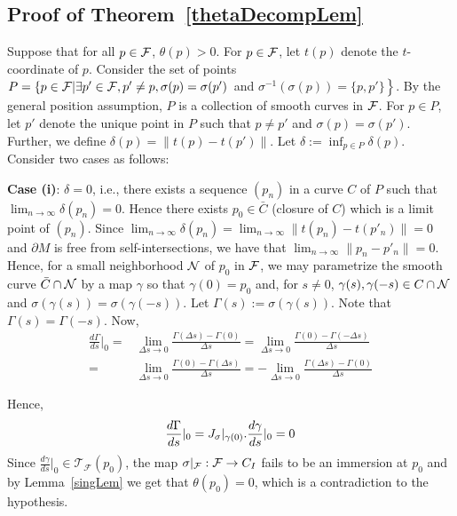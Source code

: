 \documentclass{elsart5p}
\begin{document}
\subsection{Proof of Theorem~\ref{thetaDecompLem}}  \label{proofSec}
  Suppose that for all $p \in {\cal F}$, $\theta(p) > 0$.  
For $p \in {\cal F}$, let $t(p)$ denote the $t$-coordinate of $p$.  
Consider the set of points 
$P = \left \{ p \in {\cal F} | \exists p' \in {\cal F}, p' \neq p, \sigma(p) = 
\sigma(p') \right.$ and $\left. \sigma^{-1}(\sigma(p)) =  \{ p, p' \} \right \}$.
By the general position assumption, $P$ is a collection of smooth curves in ${\cal F}$.
For $p \in P$, let $p'$ denote the unique point in $P$ such that $p \neq p'$ and 
$\sigma(p) = \sigma(p')$.
Further, we define $\delta(p) =  \| t(p) - t(p') \|$. 
Let $\delta := \displaystyle \inf_{p \in P} \delta(p)$.
Consider two cases as follows:

{\bf Case (i)}: $\delta = 0$, i.e., there exists a sequence $(p_n)$ in a curve $C$ of $P$ such that
$\displaystyle \lim_{n \to \infty} \delta(p_n) = 0$. Hence there exists $p_0 \in \bar{C}$ 
(closure of $C$)  which is a limit point of $(p_n)$.  Since $\displaystyle \lim_{n \to \infty} \delta(p_n) = 
\displaystyle \lim_{n \to \infty} \| t(p_n) - t(p'_n) \| = 0$ and $\partial M$ is free from self-intersections, 
we have that $\displaystyle \lim_{n \to \infty} \| p_n - p'_n \| = 0$. 
Hence, for a small neighborhood ${\cal N}$ of $p_0$ in ${\cal F}$,
we may parametrize the smooth curve 
$\bar{C} \cap {\cal N}$ by a map $\gamma$ so that $\gamma(0) = p_0$ and, for $s \neq 0$, 
$\gamma(s), \gamma(-s) \in C \cap {\cal N}$ and $\sigma(\gamma(s)) = \sigma(\gamma(-s))$.  
Let $\Gamma(s) := \sigma(\gamma(s))$.  Note that $\Gamma(s) = \Gamma(-s)$. Now, 
\begin{align*}
\frac{d \Gamma}{ds}| _{0} =& \displaystyle \lim_{\Delta s \to 0} \frac{\Gamma(\Delta s) - \Gamma(0)}{\Delta s} 
				= \lim_{\Delta s \to 0} \frac{\Gamma(0) - \Gamma(-\Delta s)}{\Delta s}\\
				=& \lim_{\Delta s \to 0} \frac{\Gamma(0) - \Gamma(\Delta s)}{\Delta s} 
				= \displaystyle -\lim_{\Delta s \to 0} \frac{\Gamma(\Delta s) - \Gamma(0)}{\Delta s} 
\end{align*}

Hence, 
\begin{align*}
\frac{d \Gamma}{ds}\arrowvert _{0} = J_{\sigma}|_{\gamma(0)}. \frac{d \gamma}{ds}|_{0} = 0
\end{align*}
Since $\frac{d \gamma}{ds}|_{0} \in \mathcal{T}_{\mathcal{F}}(p_0)$, 
the map $\sigma|_{{\cal F}}: {\cal F} \to C_I$ fails to be an immersion at $p_0$ 
and by Lemma~\ref{singLem} we get that $\theta(p_0) = 0$, which is a contradiction to the hypothesis.
\end{document}
